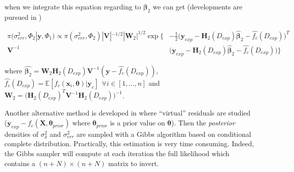 \documentclass[soumission]{jsfds}
\newcommand{\posterior}{\textit{posterior }}
\begin{document}
{when we integrate this equation regarding to $\boldsymbol{\beta}_2$ we can get (developments are pursued in \citet{kennedy2001b})


\begin{equation*}
\begin{split}
\pi(\sigma_{err}^2,\Phi_2|\boldsymbol{y},\Phi_1)  \propto \pi(\sigma_{err}^2,\Phi_2)|\boldsymbol{V}|^{-1/2}|\boldsymbol{W}_2|^{1/2}\exp\Bigg\{&-\frac{1}{2}\Big(\boldsymbol{y}_{exp}-\boldsymbol{H}_2(D_{exp})\hat{\boldsymbol{\beta}}_2-\hat{f_c}(D_{exp})\Big)^T\\\boldsymbol{V}^{-1}
&\Big(\boldsymbol{y}_{exp}-\boldsymbol{H}_2(D_{exp})\hat{\boldsymbol{\beta}}_2-\hat{f_c}(D_{exp})\Big)\Bigg\}
\end{split}
\end{equation*}


where $\hat{\boldsymbol{\beta}_2}=\boldsymbol{W}_2\boldsymbol{H}_2(D_{exp})\boldsymbol{V}^{-1}(\boldsymbol{y}-\hat{f_c}(D_{exp}))$, $\hat{f_c}(D_{exp})=\mathbb{E}[f_c(\boldsymbol{x}_i,\boldsymbol{\theta})|\boldsymbol{y}_c] \ \ \forall i \in [1,\dots,n]$ and $\boldsymbol{W}_2=\Big(\boldsymbol{H}_2(D_{exp})^T\boldsymbol{V}^{-1}\boldsymbol{H}_2(D_{exp})\Big)^{-1}$.} \newline
\fi
Another alternative method is developed in \citet{bayarri2007} where ``virtual'' residuals are studied ($\boldsymbol{y}_{exp}-f_c(\boldsymbol{X},\boldsymbol{\theta}_{prior})$ where $\boldsymbol{\theta}_{prior}$ is a prior value on $\boldsymbol{\theta}$). Then the \posterior densities of $\sigma_{\delta}^2$ and $\sigma_{err}^2$ are sampled with a Gibbs algorithm based on conditional complete distribution. Practically, this estimation is very time consuming. Indeed, the Gibbs sampler will compute at each iteration the full likelihood which contains a $(n+N)\times(n+N)$ matrix to invert.\newline

\end{document}
